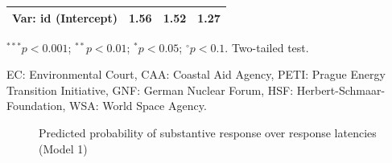 \documentclass[Royal,times,sageh]{sagej}
\begin{document}
\begin{table}
\begin{center}
\begin{small}
\begin{threeparttable}
\begin{tabular}{l D{)}{)}{9)3} D{)}{)}{9)5} D{)}{)}{9)5}}
Var: id (Intercept)            & 1.56                  & 1.52                    & 1.27                   \\
\bottomrule
\end{tabular}
\begin{tablenotes}[flushleft]
\tiny{\item $^{***}p<0.001$; $^{**}p<0.01$; $^{*}p<0.05$; 
                           $^{\circ}p<0.1$. Two-tailed test. 
                           \item EC: Environmental Court, CAA: Coastal Aid Agency, PETI: Prague Energy Transition Initiative, GNF: German Nuclear Forum, HSF: Herbert-Schmaar-Foundation, WSA: World Space Agency.}
\end{tablenotes}
\end{threeparttable}
\end{small}
\label{tab:results}
\end{center}
\end{table}

\begin{figure}
\caption{\label{fig:rl-plot}Predicted probability of substantive response over response latencies (Model 1)}\label{fig:unnamed-chunk-6}
\end{figure}
\end{document}
